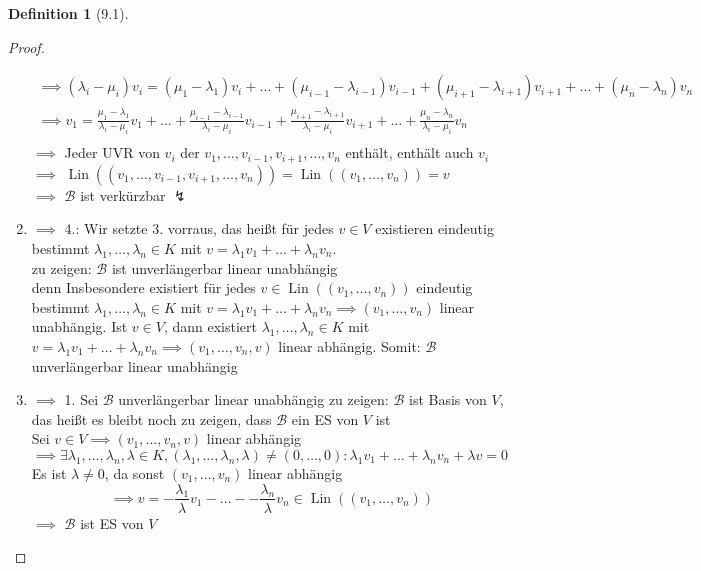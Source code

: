 \documentclass[a4paper]{scrartcl}
\DeclareMathOperator{\Exists}{\exists}
\DeclareMathOperator{\Lin}{Lin}
\theoremstyle{definition}
\newtheorem{defn}{Definition}
\theoremstyle{plain}
\theoremstyle{plain}
\theoremstyle{remark}
\theoremstyle{remark}
\theoremstyle{remark}
\theoremstyle{remark}
\theoremstyle{remark}
\begin{document}
\begin{defn}[9.1]
\begin{proof}
\begin{enumerate}
\begin{align*}
\implies (\lambda_i - \mu_i) v_i = (\mu_1 - \lambda_1)v_i + \ldots + (\mu_{i - 1} - \lambda_{i - 1})v_{i - 1} + (\mu_{i + 1} - \lambda_{i + 1}) v_{i + 1} + \ldots + (\mu_n - \lambda_n) v_n \\
\implies v_1 = \frac{\mu_{1} - \lambda_{1}}{\lambda_{i} - \mu_{i}} v_1 + \ldots + \frac{\mu_{i - 1} - \lambda_{i - 1}}{\lambda_{i} - \mu_{i}} v_{i - 1} + \frac{\mu_{i + 1} - \lambda_{i + 1}}{\lambda_{i} - \mu_{i}} v_{i + 1} + \ldots + \frac{\mu_{n} - \lambda_{n}}{\lambda_{i} - \mu_{i}} v_n \\
\end{align*}
$\implies$ Jeder UVR von $v_i$ der $v_1, \ldots, v_{i - 1}, v_{i + 1}, \ldots, v_n$  enthält, enthält auch $v_i$ \\
     $\implies$ $\Lin((v_1, \ldots, v_{i - 1}, v_{i + 1}, \ldots, v_n)) = \Lin((v_1, \ldots, v_n)) = v$ \\
     $\implies$ $\mathcal{B}$ ist verkürzbar $\lightning$
\item $\implies$ 4.: Wir setzte 3. vorraus, das heißt für jedes $v\in V$ existieren eindeutig bestimmt $\lambda_1, \ldots, \lambda_n \in K$ mit $v = \lambda_1 v_1 + \ldots + \lambda_n v_n$. \\
     zu zeigen: $\mathcal{B}$ ist unverlängerbar linear unabhängig \\
     denn Insbesondere existiert für jedes $v\in \Lin((v_1, \ldots, v_n))$ eindeutig bestimmt $\lambda_1, \ldots, \lambda_n \in K$ mit $v = \lambda_1 v_1 + \ldots + \lambda_n v_n \implies (v_1,\ldots, v_n)$ linear unabhängig.
Ist $v\in V$, dann existiert $\lambda_1, \ldots, \lambda_n \in K$ mit $v = \lambda_1 v_1 + \ldots + \lambda_n v_n \implies (v_1, \ldots, v_n, v)$ linear abhängig. Somit: $\mathcal{B}$ unverlängerbar linear unabhängig
\item $\implies$ 1. Sei $\mathcal{B}$ unverlängerbar linear unabhängig
zu zeigen: $\mathcal{B}$ ist Basis von $V$, das heißt es bleibt noch zu zeigen, dass $\mathcal{B}$ ein ES von $V$ ist \\
     Sei $v\in V \implies (v_1, \ldots, v_n, v)$ linear abhängig $\implies \Exists \lambda_1, \ldots, \lambda_n, \lambda \in K, (\lambda_1, \ldots, \lambda_n, \lambda) \neq (0, \ldots, 0): \lambda_1 v_1 + \ldots + \lambda_n v_n + \lambda v = 0$
Es ist $\lambda \neq 0$, da sonst $(v_1, \ldots, v_n)$ linear abhängig
\[\implies v = -\frac{\lambda_1}{\lambda} v_1 - \ldots - -\frac{\lambda_n}{\lambda} v_n \in \Lin((v_1, \ldots, v_n))\]
$\implies$ $\mathcal{B}$ ist ES von $V$

\end{enumerate}
\end{proof}
\end{defn}
\end{document}
